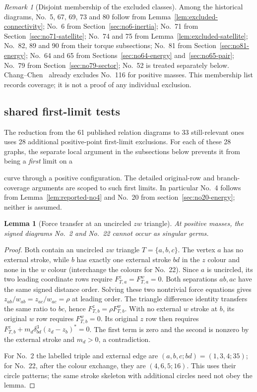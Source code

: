 \documentclass[11pt]{amsart}
\newtheorem{lemma}[theorem]{Lemma}
\theoremstyle{remark}
\newtheorem{remark}[theorem]{Remark}
\newcommand{\Needspace}[1]{\par\ifdim\dimexpr\pagegoal-\pagetotal\relax<#1\newpage\fi}
\begin{document}
\begin{remark}[Disjoint membership of the excluded classes]
\Needspace{7\baselineskip}
Among the historical diagrams, No.~5, 67, 69, 73 and 80
follow from Lemma~\ref{lem:excluded-connectivity}; No.~6
from Section~\ref{sec:no6-inertia}; No.~71 from
Section~\ref{sec:no71-satellite}; No.~74 and 75 from
Lemma~\ref{lem:excluded-satellite}; No.~82, 89 and 90
from their torque subsections; No.~81 from
Section~\ref{sec:no81-energy}; No.~64 and 65 from
Sections~\ref{sec:no64-energy} and~\ref{sec:no65-pair};
No.~79 from Section~\ref{sec:no79-sector}; No.~52 is
treated separately below. Chang--Chen~\cite[Table~6.1]{CCII}
already excludes No.~116 for positive masses. This
membership list records coverage; it is not a proof of any
individual exclusion.

\end{remark}

\subsection*{shared first-limit tests}

The reduction from the 61 published relation diagrams to
33 still-relevant ones uses 28 additional positive-point
first-limit exclusions. For each of these 28 graphs,
the separate local argument in the subsections below
prevents it from being a \emph{first} limit on a

curve through a positive configuration. The detailed
original-row and branch-coverage arguments are scoped
to such first limits. In particular No.~4 follows from
Lemma~\ref{lem:reported-no4} and No.~20 from
section~\ref{sec:no20-energy}; neither is assumed.
\begin{lemma}[Force transfer at an uncircled $zw$ triangle]\label{lem:reported-force-transfer}
At positive masses, the signed diagrams No.~2 and No.~22 cannot occur as singular germs.
\end{lemma}
\begin{proof}
Both contain an uncircled $zw$ triangle $T=\{a,b,c\}$. The vertex $a$ has no external stroke, while $b$ has exactly one external stroke $bd$ in the $z$ colour and none in the $w$ colour (interchange the colours for No.~22). Since $a$ is uncircled, its two leading coordinate rows require $F^z_{T,a}=F^w_{T,a}=0$. Both separations $ab,ac$ have the same signed distance order. Solving these two nontrivial force equations gives $z_{ab}/w_{ab}=z_{ac}/w_{ac}=\rho$ at leading order. The triangle difference identity transfers the same ratio to $bc$, hence $F^z_{T,b}=\rho F^w_{T,b}$. With no external $w$ stroke at $b$, its original $w$ row requires $F^w_{T,b}=0$. Its original $z$ row then requires $F^z_{T,b}+m_d\delta_{bd}^3(z_d-z_b)^*=0$. The first term is zero and the second is nonzero by the external stroke and $m_d>0$, a contradiction.

For No.~2 the labelled triple and external edge are $(a,b,c;bd)=(1,3,4;35)$; for No.~22, after the colour exchange, they are $(4,6,5;16)$. This uses their circle patterns; the same stroke skeleton with additional circles need not obey the lemma.
\end{proof}
\end{document}
